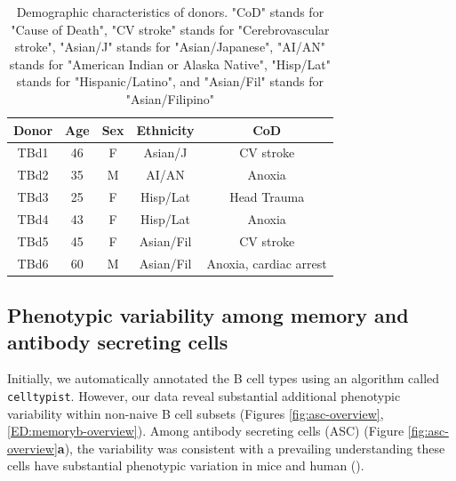 \begin{table}[t]
\centering
\begin{tabular}{|c|c|c|c|c|}
\hline
\textbf{Donor} & \textbf{Age} & \textbf{Sex} & \textbf{Ethnicity} & \textbf{CoD} \\
\hline
TBd1 & 46 & F & Asian/J & CV stroke \\
TBd2 & 35 & M & AI/AN & Anoxia \\
TBd3 & 25 & F & Hisp/Lat & Head Trauma \\
TBd4 & 43 & F & Hisp/Lat & Anoxia \\
TBd5 & 45 & F & Asian/Fil & CV stroke  \\
TBd6 & 60 & M & Asian/Fil & Anoxia, cardiac arrest \\
\hline
\end{tabular}
    \caption[Demographic characteristics of donors]{Demographic characteristics of donors. "CoD" stands for "Cause of Death", "CV stroke" stands for "Cerebrovascular stroke", "Asian/J" stands for "Asian/Japanese", "AI/AN" stands for "American Indian or Alaska Native", "Hisp/Lat" stands for "Hispanic/Latino", and "Asian/Fil" stands for "Asian/Filipino"}
    \label{tab:donor-metadata}
\end{table}



\subsection{Phenotypic variability among memory and antibody secreting cells}



Initially, we automatically annotated the B cell types using an algorithm called \verb|celltypist|\cite{dominguez2022cross}. However, our data reveal substantial additional phenotypic variability within non-naive B cell subsets (Figures \ref{fig:asc-overview}, \ref{ED:memoryb-overview}). Among antibody secreting cells (ASC) (Figure \ref{fig:asc-overview}\textbf{a}), the variability was consistent with a prevailing understanding these cells have substantial phenotypic variation in mice and human (\cite{tarlinton2023making, halliley2015long}). 

